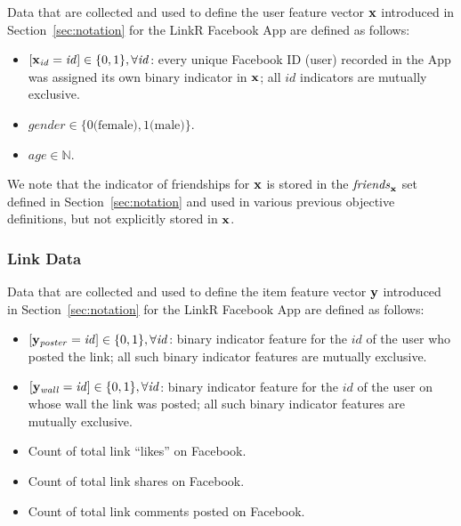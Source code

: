Data that are collected and used to define the user feature vector
$\mathbf{x}$ introduced in Section~\ref{sec:notation} for the LinkR Facebook
App are defined as follows:
\begin{itemize}
\item $[\mathbf{x}_\mathit{id} = \mathit{id}] \in \{ 0, 1 \}, \forall \mathit{id}$: 
every unique Facebook ID (user) recorded in the App was assigned its own
binary indicator in $\mathbf{x}$; all $\mathit{id}$ indicators are mutually exclusive.
\item $\mathit{gender} \in \{ 0 \mbox{(female)}, 1 \mbox{(male)} \}$.
\item $\mathit{age} \in \mathbb{N}$.
\end{itemize}
We note that the indicator of friendships for $\mathbf{x}$ is stored in the
$\mathit{friends}_{\mathbf{x}}$ set defined in Section~\ref{sec:notation} and
used in various previous objective definitions, but not explicitly 
stored in $\mathbf{x}$.

\subsubsection{Link Data}

\label{sec:link_data}

Data that are collected and used to define the item feature vector
$\mathbf{y}$ introduced in Section~\ref{sec:notation} for the LinkR Facebook
App are defined as follows:
\begin{itemize}
\item $[\mathbf{y}_\mathit{poster} = \mathit{id}] \in \{ 0, 1 \}, \forall \mathit{id}$:  
binary indicator feature for the $\mathit{id}$ of the user who posted the link;
all such binary indicator features are mutually exclusive.
\item $[\mathbf{y}_\mathit{wall} = \mathit{id}] \in \{ 0, 1 \}, \forall \mathit{id}$:
binary indicator feature for the $\mathit{id}$ of the user on whose wall the link was posted; all such binary indicator features are mutually exclusive.
\item Count of total link ``likes'' on Facebook.
\item Count of total link shares on Facebook.
\item Count of total link comments posted on Facebook.
\end{itemize}

